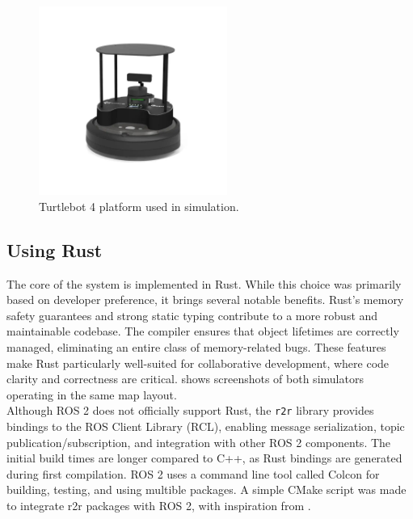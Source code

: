 \begin{figure}[h]
    \begin{center}
        \includegraphics[width=0.55\textwidth]{figures/tb4.png}
    \end{center}
    \caption{Turtlebot 4 platform used in simulation.}
    \label{fig:tb4}
\end{figure}

\subsection{Using Rust}
The core of the system is implemented in Rust. While this choice was primarily based on developer preference, it brings several notable benefits. 
Rust's memory safety guarantees and strong static typing contribute to a more robust and maintainable codebase. The compiler ensures that object lifetimes are correctly managed, eliminating an entire class of memory-related bugs. These features make Rust particularly well-suited for collaborative development, where code clarity and correctness are critical.  shows screenshots of both simulators operating in the same map layout.\\

Although ROS 2 does not officially support Rust, the \texttt{r2r} library \cite{r2r} provides bindings to the ROS Client Library (RCL), enabling message serialization, topic publication/subscription, and integration with other ROS 2 components. The initial build times are longer compared to C++, as Rust bindings are generated during first compilation. ROS 2 uses a command line tool called Colcon \cite{colcon} for building, testing, and using multible packages. A simple CMake script was made to integrate r2r packages with ROS 2, with inspiration from \cite{r2r-minimal-node}.

